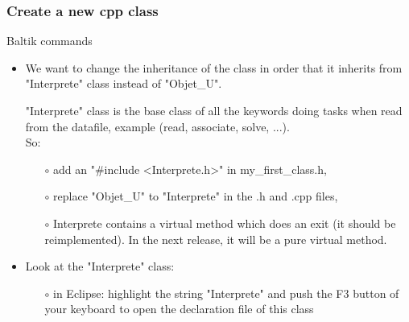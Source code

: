 \documentclass[10pt, hyperref={unicode=true,pdfusetitle, bookmarks=true,bookmarksnumbered=false,bookmarksopen=false, breaklinks=false,pdfborder={0 0 1},backref=true,colorlinks=true,linkcolor=darkblue,pageanchor, urlcolor=darkblue}]{beamer}
\begin{document}
\begin{frame}
\frametitle{Create a new cpp class}
\begin{block}{Baltik commands}

\begin{itemize}
\item We want to change the inheritance of the class in order that it inherits from "Interprete" class
instead of "Objet\_U".

"Interprete" class is the base class of all the keywords doing tasks when read from the datafile, example (read, associate, solve, ...).\\
\vspace{0.1cm}
So:
    \begin{itemize}
    \item [$\circ$] add an "\#include <Interprete.h>" in my\_first\_class.h,
    \item [$\circ$] replace "Objet\_U" to "Interprete" in the .h and .cpp files,
    \item [$\circ$] Interprete contains a virtual method which does an exit (it should be reimplemented). In the next release, it will be a pure virtual method.\\
    \end{itemize}


\item Look at the "Interprete" class:
    \begin{itemize}
    \item [$\circ$] in Eclipse: highlight the string "Interprete" and push the F3 button of your keyboard to open the declaration file of this class
    \end{itemize}
\end{itemize}

\end{block}
\end{frame}
\end{document}
